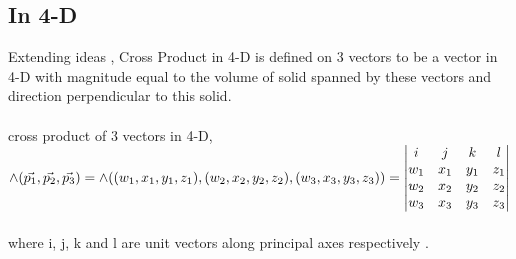\documentclass{article}
\begin{document}
    \subsection{ In 4-D }
    Extending ideas , Cross Product in 4-D is defined on 3 vectors to be a vector in 4-D with magnitude equal to the volume of solid spanned by these vectors and direction perpendicular to this solid. \\ \\
    cross product of 3 vectors in 4-D, \\
    $\land ( \Vec{p_1}, \Vec{p_2}, \Vec{p_3}) = \land{ ((w_1,x_1,y_1,z_1), (w_2,x_2,y_2,z_2) , (w_3,x_3,y_3,z_3))} = \mdet{i & j & k & l \\ w_1 & x_1 & y_1 & z_1 \\ w_2 & x_2 & y_2 & z_2 \\ w_3 & x_3 & y_3 & z_3}$ \\ \\
    where i, j, k and l are unit vectors along principal axes respectively .
\end{document}

